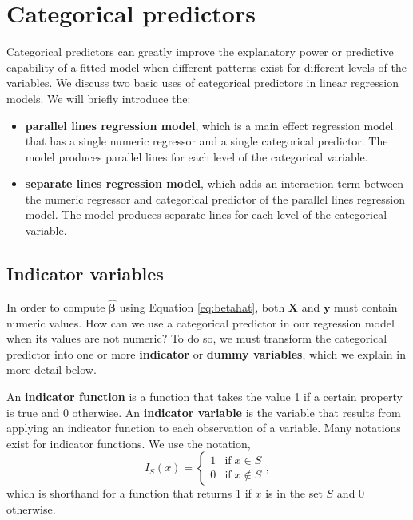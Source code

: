 \documentclass[
]{book}
\providecommand{\tightlist}{%
  \setlength{\itemsep}{0pt}\setlength{\parskip}{0pt}}
\theoremstyle{definition}
\theoremstyle{definition}
\theoremstyle{definition}
\theoremstyle{definition}
\theoremstyle{remark}
\begin{document}
\hypertarget{categorical-predictors}{%
\section{Categorical predictors}\label{categorical-predictors}}

Categorical predictors can greatly improve the explanatory power or predictive capability of a fitted model when different patterns exist for different levels of the variables. We discuss two basic uses of categorical predictors in linear regression models. We will briefly introduce the:

\begin{itemize}
\tightlist
\item
  \textbf{parallel lines regression model}, which is a main effect regression model that has a single numeric regressor and a single categorical predictor. The model produces parallel lines for each level of the categorical variable.
\item
  \textbf{separate lines regression model}, which adds an interaction term between the numeric regressor and categorical predictor of the parallel lines regression model. The model produces separate lines for each level of the categorical variable.
\end{itemize}

\hypertarget{indicator-variables}{%
\subsection{Indicator variables}\label{indicator-variables}}

In order to compute \(\hat{\boldsymbol{\beta}}\) using Equation \eqref{eq:betahat}, both \(\mathbf{X}\) and \(\mathbf{y}\) must contain numeric values. How can we use a categorical predictor in our regression model when its values are not numeric? To do so, we must transform the categorical predictor into one or more \textbf{indicator} or \textbf{dummy variables}, which we explain in more detail below.

An \textbf{indicator function} is a function that takes the value 1 if a certain property is true and 0 otherwise. An \textbf{indicator variable} is the variable that results from applying an indicator function to each observation of a variable. Many notations exist for indicator functions. We use the notation,
\[
I_S(x) =
\begin{cases}
1 & \textrm{if}\;x \in S\\
0 & \textrm{if}\;x \notin S
\end{cases},
\]
which is shorthand for a function that returns 1 if \(x\) is in the set \(S\) and 0 otherwise.
\end{document}
